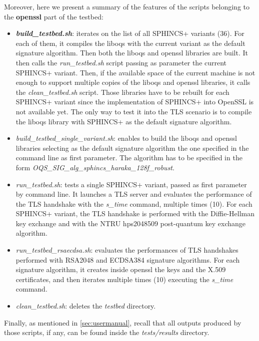 \documentclass[a4paper,12pt]{article}
\begin{document}
Moreover, here we present a summary of the features of the scripts belonging to the \textbf{openssl} part of the testbed:
\begin{itemize}
    \item \textbf{\textit{build\_testbed.sh}}: iterates on the list of all SPHINCS+ variants (36). For each of them, it compiles the liboqs with the current variant as the default signature algorithm. Then both the liboqs and openssl libraries are built. It then calls the \textit{run\_testbed.sh} script passing as parameter the current SPHINCS+ variant. Then, if the available space of the current machine is not enough to support multiple copies of the liboqs and openssl libraries, it calls the \textit{clean\_testbed.sh} script. Those libraries have to be rebuilt for each SPHINCS+ variant since the implementation of SPHINCS+ into OpenSSL is not available yet. The only way to test it into the TLS scenario is to compile the liboqs library with SPHINCS+ as the default signature algorithm.
    \item \textit{build\_testbed\_single\_variant.sh}: enables to build the liboqs and openssl libraries selecting as the default signature algorithm the one specified in the command line as first parameter. The algorithm has to be specified in the form \textit{OQS\_SIG\_alg\_sphincs\_haraka\_128f\_robust}.
    \item \textit{run\_testbed.sh}: tests a single SPHINCS+ variant, passed as first parameter by command line. It launches a TLS server and evaluates the performance of the TLS handshake with the \textit{s\_time} command, multiple times (10). For each SPHINCS+ variant, the TLS handshake is performed with the Diffie-Hellman key exchange and with the NTRU hps2048509 post-quantum key exchange algorithm.
    \item \textit{run\_testbed\_rsaecdsa.sh}: evaluates the performances of TLS handshakes performed with RSA2048 and ECDSA384 signature algorithms. For each signature algorithm, it creates inside openssl the keys and the X.509 certificates, and then iterates multiple times (10) executing the \textit{s\_time} command.
    \item \textit{clean\_testbed.sh}: deletes the \textit{testbed} directory.
\end{itemize}

Finally, as mentioned in \ref{sec:usermanual}, recall that all outputs produced by those scripts, if any, can be found inside the \textit{tests/results} directory.
\end{document}
